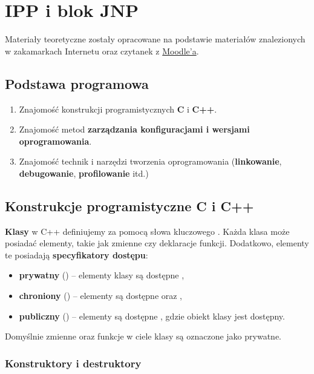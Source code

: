 \chapter{IPP i blok JNP}

Materiały teoretyczne zostały opracowane na podstawie materiałów znalezionych w zakamarkach Internetu oraz czytanek z \href{https://moodle.mimuw.edu.pl/course/view.php?id=1047}{Moodle'a}.

\section*{Podstawa programowa}
\begin{enumerate}
    \item Znajomość konstrukcji programistycznych \textbf{C} i \textbf{C++}.
    \item Znajomość metod \textbf{zarządzania konfiguracjami i wersjami oprogramowania}.
    \item Znajomość technik i narzędzi tworzenia oprogramowania (\textbf{linkowanie}, \textbf{debugowanie}, \textbf{profilowanie} itd.)
\end{enumerate}

\section{Konstrukcje programistyczne C i C++}

\textbf{Klasy} w C++ definiujemy za pomocą słowa kluczowego . Każda klasa może posiadać elementy, takie jak zmienne czy deklaracje funkcji. Dodatkowo, elementy te posiadają \textbf{specyfikatory dostępu}:
\begin{itemize}
    \item \textbf{prywatny} () -- elementy klasy są dostępne ,
    \item \textbf{chroniony} () -- elementy są dostępne  oraz ,
    \item \textbf{publiczny} () -- elementy są dostępne , gdzie obiekt klasy jest dostępny.
\end{itemize}
Domyślnie zmienne oraz funkcje w ciele klasy są oznaczone jako prywatne.

\subsection{Konstruktory i destruktory}

